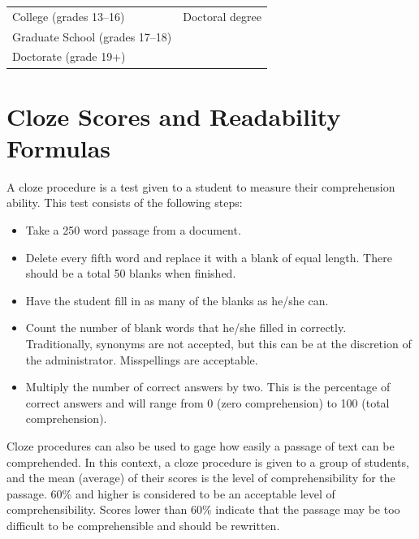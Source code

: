 \documentclass[
]{book}
\providecommand{\tightlist}{%
  \setlength{\itemsep}{0pt}\setlength{\parskip}{0pt}}
\theoremstyle{definition}
\theoremstyle{definition}
\theoremstyle{definition}
\theoremstyle{definition}
\theoremstyle{remark}
\begin{document}
\begin{table}
\begin{tabular}[t]{>{}l|l}
\hspace{1em}College (grades 13–16) & \hspace{1em}Doctoral degree\\
\hspace{1em}Graduate School (grades 17–18) & \hspace{1em}\\
\hspace{1em}Doctorate (grade 19+) & \hspace{1em}\\
\bottomrule
\end{tabular}
\end{table}

\hypertarget{cloze}{%
\section{Cloze Scores and Readability Formulas}\label{cloze}}

\begin{minipage}{\textwidth}

A cloze procedure is a test given to a student to measure their comprehension ability. This test consists of the following steps:

\begin{itemize}
\tightlist
\item
  Take a 250 word passage from a document.
\item
  Delete every fifth word and replace it with a blank of equal length. There should be a total 50 blanks when finished.
\item
  Have the student fill in as many of the blanks as he/she can.
\item
  Count the number of blank words that he/she filled in correctly. Traditionally, synonyms are not accepted, but this can be at the discretion of the administrator. Misspellings are acceptable.
\item
  Multiply the number of correct answers by two. This is the percentage of correct answers and will range from 0 (zero comprehension) to 100 (total comprehension).
\end{itemize}

\end{minipage}

Cloze procedures can also be used to gage how easily a passage of text can be comprehended. In this context, a cloze procedure is given to a group of students, and the mean (average) of their scores is the level of comprehensibility for the passage. 60\% and higher is considered to be an acceptable level of comprehensibility. Scores lower than 60\% indicate that the passage may be too difficult to be comprehensible and should be rewritten.
\end{document}

